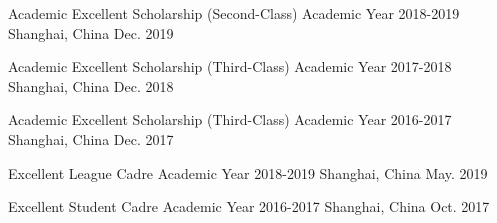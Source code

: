 




\begin{cvhonors}


    \cvhonor
    {Academic Excellent Scholarship (Second-Class)} %
    {Academic Year 2018-2019} %
    {Shanghai, China} %
    {Dec. 2019} %


    \cvhonor
    {Academic Excellent Scholarship (Third-Class)} %
    {Academic Year 2017-2018} %
    {Shanghai, China} %
    {Dec. 2018} %


    \cvhonor
    {Academic Excellent Scholarship (Third-Class)} %
    {Academic Year 2016-2017} %
    {Shanghai, China} %
    {Dec. 2017} %


\end{cvhonors}




\begin{cvhonors}


    \cvhonor
    {Excellent League Cadre} %
    {Academic Year 2018-2019} %
    {Shanghai, China} %
    {May. 2019} %


    \cvhonor
    {Excellent Student Cadre} %
    {Academic Year 2016-2017} %
    {Shanghai, China} %
    {Oct. 2017} %


\end{cvhonors}
